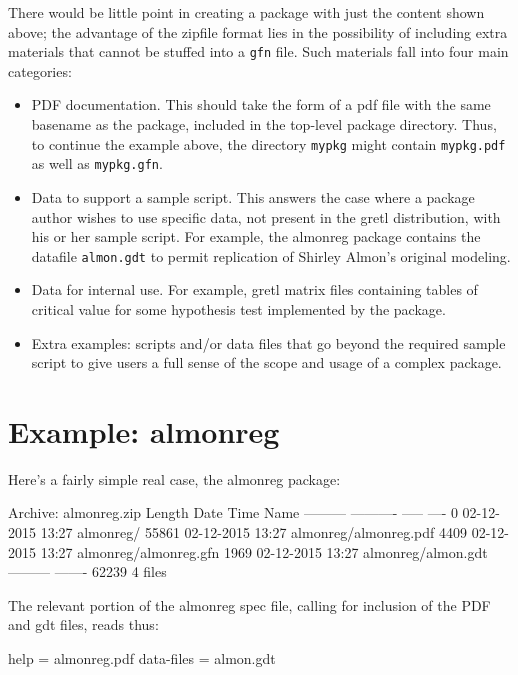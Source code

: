 \documentclass[oneside]{book}
\begin{document}
There would be little point in creating a package with just the
content shown above; the advantage of the zipfile format lies in the
possibility of including extra materials that cannot be stuffed into
a \texttt{gfn} file. Such materials fall into four main categories:

\begin{itemize}
\item PDF documentation. This should take the form of a pdf file with
  the same basename as the package, included in the top-level package
  directory. Thus, to continue the example above, the directory
  \texttt{mypkg} might contain \texttt{mypkg.pdf} as well as
  \texttt{mypkg.gfn}.
\item Data to support a sample script. This answers the case where a
  package author wishes to use specific data, not present in the gretl
  distribution, with his or her sample script. For example, the
  \textsf{almonreg} package contains the datafile \texttt{almon.gdt}
  to permit replication of Shirley Almon's original modeling.
\item Data for internal use. For example, gretl matrix files
  containing tables of critical value for some hypothesis test
  implemented by the package.
\item Extra examples: scripts and/or data files that go beyond the
  required sample script to give users a full sense of the scope and
  usage of a complex package.
\end{itemize}

\section{Example: \textsf{almonreg}}

Here's a fairly simple real case, the \textsf{almonreg} package:
%
\begin{code}
Archive:  almonreg.zip
  Length      Date    Time    Name
---------  ---------- -----   ----
        0  02-12-2015 13:27   almonreg/
    55861  02-12-2015 13:27   almonreg/almonreg.pdf
     4409  02-12-2015 13:27   almonreg/almonreg.gfn
     1969  02-12-2015 13:27   almonreg/almon.gdt
---------                     -------
    62239                     4 files
\end{code}

The relevant portion of the \textsf{almonreg} spec file, calling for
inclusion of the PDF and gdt files, reads thus:
%
\begin{code}
help = almonreg.pdf
data-files = almon.gdt
\end{code}
\end{document}
